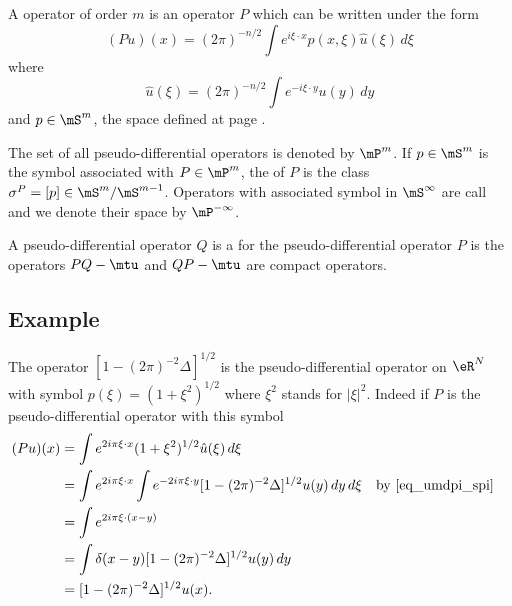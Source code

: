 \begin{definition}	
	A  operator of order $m$ is an operator $P$ which can be written under the form
	\begin{equation}
		(Pu)(x)=(2\pi)^{-n/2}\int e^{i\xi\cdot x}p(x,\xi)\hat u(\xi)\,d\xi
	\end{equation}
	where
	\begin{equation}
		\hat u(\xi)=(2\pi)^{-n/2}\int e^{-i\xi\cdot y}u(y)\,dy
	\end{equation}
	and $p\in\mS^m$, the space defined at page \pageref{pg:defmS}.  
\end{definition}

The set of all pseudo-differential operators is denoted by $\mP^m$. If $p\in\mS^m$ is the symbol associated with $P\in\mP^m$, the  of $P$ is the class $\sigma^P=[p]\in\mS^m/\mS^{m-1}$. Operators with associated symbol in $\mS^{\-\infty}$ are call  and we denote their space by $\mP^{-\infty}$.

A pseudo-differential operator $Q$ is a  for the pseudo-differential operator $P$ is the operators $PQ-\mtu$ and $QP-\mtu$ are compact operators.


\subsection{Example} \label{pg_exem_psdo}

The operator $[1-(2\pi)^{-2}\Delta]^{1/2}$ is the pseudo-differential operator on $\eR^N$ with symbol $p(\xi)=(1+\xi^2)^{1/2}$ where $\xi^2$ stands for $| \xi |^2$. Indeed if $P$ is the pseudo-differential operator with this symbol
\[
\begin{aligned}
  (Pu)(x)&=\int e^{2i\pi\xi\cdot x} (1+\xi^2)^{1/2}\hat u(\xi)\,d\xi\\
   	&=\int e^{2i\pi\xi\cdot x}\int e^{-2i\pi\xi\cdot y}[1-(2\pi)^{-2}\Delta]^{1/2}u(y)\,dy\,d\xi	&& \text{by \eqref{eq_umdpi_spi}}\\
	&=\int e^{2i\pi\xi\cdot(x-y)}\\
	&=\int\delta(x-y)[1-(2\pi)^{-2}\Delta]^{1/2}u(y)\,dy\\
	&=[1-(2\pi)^{-2}\Delta]^{1/2}u(x).
\end{aligned}
\]


